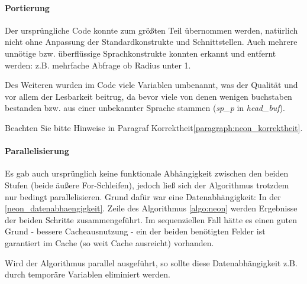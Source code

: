 \paragraph{Portierung}
\label{neon_portierung}
Der ursprüngliche Code konnte zum größten Teil übernommen werden, natürlich nicht ohne Anpassung der Standardkonstrukte und Schnittstellen.
Auch mehrere unnötige bzw. überflüssige Sprachkonstrukte konnten erkannt und entfernt werden: z.B. mehrfache Abfrage ob Radius unter 1.

Des Weiteren wurden im Code viele Variablen umbenannt, was der Qualität und vor allem der Lesbarkeit beitrug, da bevor viele von denen wenigen buchstaben bestanden bzw. aus einer unbekannter Sprache stammen (\emph{sp\_p} in \emph{head\_buf}).

Beachten Sie bitte Hinweise in Paragraf Korrektheit\ref{paragraph:neon_korrektheit}.
















\paragraph{Parallelisierung}
Es gab auch ursprünglich keine funktionale Abhängigkeit zwischen den beiden Stufen (beide äußere For-Schleifen),  jedoch ließ sich der Algorithmus trotzdem nur bedingt parallelisieren. Grund dafür war eine Datenabhängigkeit: In der \ref{neon_datenabhaengigkeit}. Zeile des Algorithmus \ref{algo:neon} werden Ergebnisse der beiden Schritte zusammengeführt. Im sequenziellen Fall hätte es einen guten Grund - bessere Cacheausnutzung - ein der beiden benötigten Felder ist garantiert im Cache (so weit Cache ausreicht) vorhanden.

Wird der Algorithmus parallel ausgeführt, so sollte diese Datenabhängigkeit z.B. durch temporäre Variablen eliminiert werden. 


